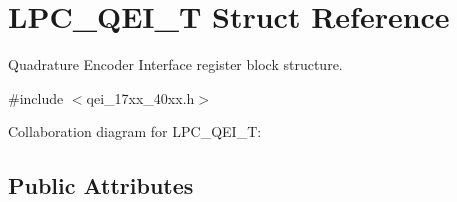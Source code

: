 \hypertarget{structLPC__QEI__T}{}\section{L\+P\+C\+\_\+\+Q\+E\+I\+\_\+T Struct Reference}
\label{structLPC__QEI__T}


Quadrature Encoder Interface register block structure.  




{\ttfamily \#include $<$qei\+\_\+17xx\+\_\+40xx.\+h$>$}



Collaboration diagram for L\+P\+C\+\_\+\+Q\+E\+I\+\_\+T\+:
\subsection*{Public Attributes}
